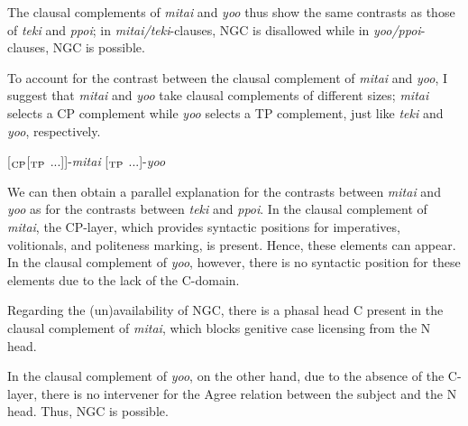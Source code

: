 \documentclass[output=paper]{langscibook}
\begin{document}
The clausal complements of \emph{mitai} and \emph{yoo} thus show the same contrasts as those of \emph{teki} and \emph{ppoi}; in \emph{mitai/teki}-clauses, NGC is disallowed while in \emph{yoo/ppoi}-clauses, NGC is possible.

To account for the contrast between the clausal complement of \emph{mitai} and \emph{yoo}, I suggest that \emph{mitai} and \emph{yoo} take clausal complements of different sizes; \emph{mitai} selects a CP complement while \emph{yoo} selects a TP complement, just like \emph{teki} and \emph{yoo}, respectively.

\begin{exe}
\ex \label{saito28}
\begin{xlist}
\ex \label{saito28a}
[$_{\textnormal{CP}}$[$_{\textnormal{TP}}$ ...]]-\emph{mitai}
\ex \label{saito28b} [$_{\textnormal{TP}}$ ...]-\emph{yoo}
\end{xlist}
\end{exe}

We can then obtain a parallel explanation for the contrasts between \emph{mitai} and \emph{yoo} as for the contrasts between \emph{teki} and \emph{ppoi}. In the clausal complement of \emph{mitai}, the CP-layer, which provides syntactic positions for imperatives, volitionals, and politeness marking, is present. Hence, these elements can appear. In the clausal complement of \emph{yoo}, however, there is no syntactic position for these elements due to the lack of the C-domain.

Regarding the (un)availability of NGC, there is a phasal head C present in the clausal complement of \emph{mitai}, which blocks genitive case licensing from the N head.

\begin{exe}
\ex \label{saito29}
\end{exe}
In the clausal complement of \emph{yoo}, on the other hand, due to the absence of the C-layer, there is no intervener for the Agree relation between the subject and the N head. Thus, NGC is possible.
\end{document}
